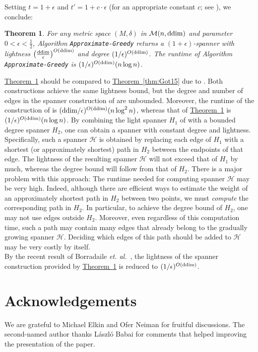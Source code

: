 \documentclass[11pt,letterpaper]{article}
\newtheorem{theorem}{Theorem}
\newcommand{\ddim}{{\rm ddim}}
\newcommand{\etal}{\emph{et. al.}}
\newcommand{\eps}{\epsilon}
\newcommand{\namedref}[2]{\hyperref[#2]{#1~\ref*{#2}}}
\newcommand{\theoremref}[1]{\namedref{Theorem}{#1}}
\begin{document}
Setting $t = 1+\eps$ and $t' = 1+c \cdot \eps$ (for an appropriate constant $c$; see \cite{GLN02,NS07}), we conclude:
\begin{theorem}  \label{finish} \sloppy
	For any  metric  space $(M,\delta)$ in $\mathcal{M}(n,\ddim)$ and parameter $0<\epsilon<\frac{1}{2}$, Algorithm \texttt{Approximate-Greedy}
	returns a $(1+\eps)$-spanner with lightness $\left(\frac{\ddim}{\eps}\right)^{O(\ddim)}$ and degree $(1/\eps)^{O(\ddim)}$.
	The runtime of Algorithm \texttt{Approximate-Greedy} is $(1/\eps)^{O(\ddim)}(n \log n)$.
\end{theorem}
	\theoremref{finish} should be compared to \theoremref{thm:Got15} due to \cite{Got15}.
Both constructions achieve the same lightness bound, but the degree and number of edges in the spanner construction of \cite{Got15} are unbounded.
Moreover, the runtime of the construction of \cite{Got15} is $(\ddim/\epsilon)^{O(\ddim)} (n\log^{2}n)$, whereas that
of \theoremref{finish} is $(1/\eps)^{O(\ddim)}(n \log n)$.
By combining the light spanner $H_1$ of \cite{Got15} with a bounded degree spanner $H_2$, one can obtain a spanner with constant degree and   lightness.
Specifically, such a spanner $\mathcal{H}$ is obtained by replacing each edge of $H_1$ with a shortest (or approximately shortest) path in $H_2$ between the endpoints of that edge.
The lightness of the resulting spanner $\mathcal{H}$ will not exceed that of $H_1$ by much, whereas the degree bound  will follow from that of $H_2$.
There is a major problem with this approach: The runtime needed for computing spanner $\mathcal{H}$ may be very high.
Indeed, although there are efficient ways to estimate the weight of an approximately shortest path in $H_2$ between two points,
we must \emph{compute} the corresponding path in $H_2$.
In particular, to achieve the degree bound of $H_2$, one may not use edges outside $H_2$.
Moreover, even regardless of this computation time, such a path may contain many edges that already belong to the gradually growing spanner $\mathcal{H}$.
Deciding which edges of this path should be added to $\mathcal{H}$ may be very costly by itself.\\
By the recent result of Borradaile \etal ~\cite{BLW19}, the lightness of the spanner construction provided by   \theoremref{finish} is reduced to $(1/\epsilon)^{O(\ddim)}$.


\section{Acknowledgements}  We are grateful to Michael Elkin and Ofer Neiman for fruitful discussions.
The second-named author thanks L\'{a}szl\'{o} Babai for comments that helped improving the presentation of the paper.



\end{document}

